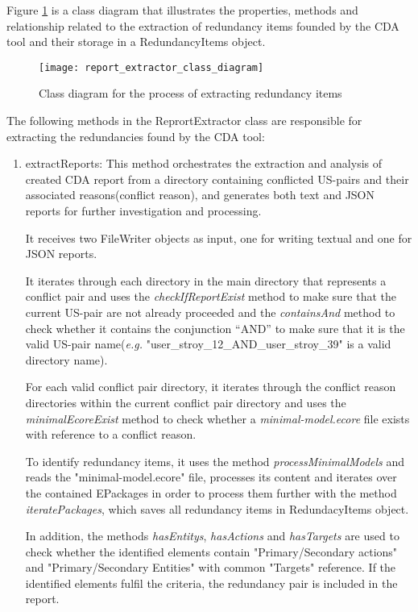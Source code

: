 Figure \ref{fig:report_extractor_class_diagram} is a class diagram that illustrates the properties, methods and relationship related to the extraction of redundancy items founded by the CDA tool and their storage in a RedundancyItems object.
\begin{figure}[h]
	\centering
	\texttt{[image: report\_extractor\_class\_diagram]}
	\caption{Class diagram for the process of extracting redundancy items}\label{fig:report_extractor_class_diagram}
\end{figure} 

The following methods in the ReprortExtractor class are responsible for extracting the redundancies found by the CDA tool:
\begin{enumerate}
	\item extractReports: This method orchestrates the extraction and analysis of created CDA report from a directory containing conflicted US-pairs and their associated reasons(conflict reason), and generates both text and JSON reports for further investigation and processing.
	
	It receives two FileWriter objects as input, one for writing textual and one for JSON reports.
	
	It iterates through each directory in the main directory that represents a conflict pair and uses the \textit{checkIfReportExist} method to make sure that the current US-pair are not already proceeded and the \textit{containsAnd} method to check whether it contains the conjunction \enquote{AND} to make sure that it is the valid US-pair name(\textit{e.g.} "user\_stroy\_12\_AND\_user\_stroy\_39" is a valid directory name).
	
	For each valid conflict pair directory, it iterates through the conflict reason directories within the current conflict pair directory and uses the \textit{minimalEcoreExist} method to check whether a \textit{minimal-model.ecore} file exists with reference to a conflict reason.
	
	To identify redundancy items, it uses the method \textit{processMinimalModels} and reads the "minimal-model.ecore" file, processes its content and iterates over the contained EPackages in order to process them further with the method \textit{iteratePackages}, which saves all redundancy items in RedundacyItems object.
	
	In addition, the methods \textit{hasEntitys}, \textit{hasActions} and \textit{hasTargets} are used to check whether the identified elements contain "Primary/Secondary actions" and "Primary/Secondary Entities" with common "Targets" reference. If the identified elements fulfil the criteria, the redundancy pair is included in the report.
	

\end{enumerate}
